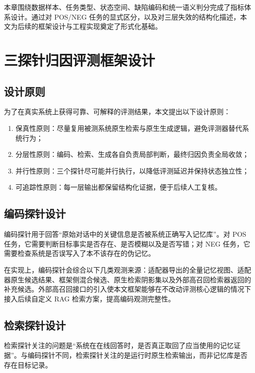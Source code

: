 本章围绕数据样本、任务类型、状态空间、缺陷编码和统一语义判分完成了指标体系设计。通过对 POS/NEG 任务的显式区分，以及对三层失效的结构化描述，本文为后续的框架设计与工程实现奠定了形式化基础。

\chapter{三探针归因评测框架设计}

\section{设计原则}

为了在真实系统上获得可靠、可解释的评测结果，本文提出以下设计原则：

\begin{enumerate}
    \item 保真性原则：尽量复用被测系统原生检索与原生生成逻辑，避免评测器替代系统行为；
    \item 分层性原则：编码、检索、生成各自负责局部判断，最终归因负责全局收敛；
    \item 并行性原则：三个探针尽可能并行执行，以降低评测延迟并保持状态独立性；
    \item 可追踪性原则：每一层输出都保留结构化证据，便于后续人工复核。
\end{enumerate}

\section{编码探针设计}

编码探针用于回答“原始对话中的关键信息是否被系统正确写入记忆库”。对 POS 任务，它需要判断目标事实是否存在、是否模糊以及是否写错；对 NEG 任务，它需要检查系统是否误写入了本不该存在的伪记忆。

在实现上，编码探针会综合以下几类观测来源：适配器导出的全量记忆视图、适配器原生候选结果、框架侧混合候选、原生检索阴影集以及外部高召回检索器返回的补充候选。外部高召回接口的引入使本文框架能够在不改动评测核心逻辑的情况下接入后续自定义 RAG 检索方案，提高编码观测完整性。

\section{检索探针设计}

检索探针关注的问题是“系统在在线回答时，是否真正取回了应当使用的记忆证据”。与编码探针不同，检索探针关注的是运行时原生检索输出，而非记忆库是否存在目标记录。

